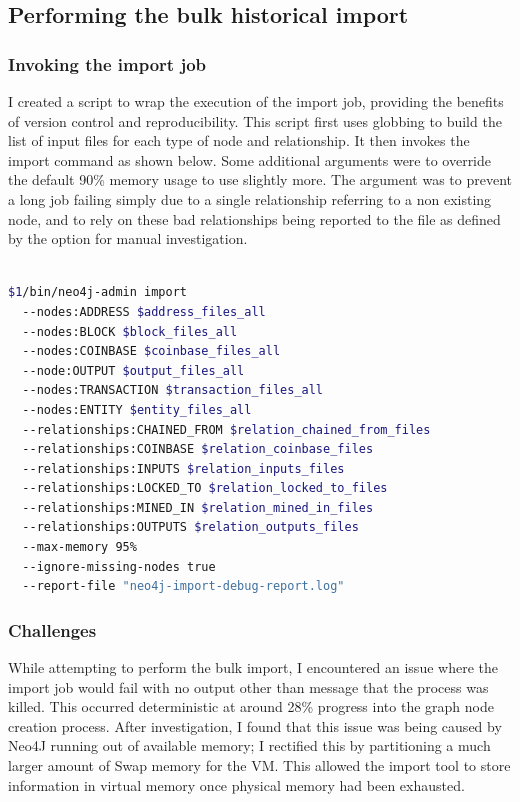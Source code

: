 \subsection{Performing the bulk historical import}

\subsubsection{Invoking the import job}
I created a script to wrap the execution of the import job, providing the benefits of version control and reproducibility. This script first uses globbing to build the list of input files for each type of node and relationship. It then invokes the import command as shown below. Some additional arguments were  to override the default 90\% memory usage to use slightly more. The argument  was to prevent a long job failing simply due to a single relationship referring to a non existing node, and to rely on these bad relationships being reported to the file as defined by the  option for manual investigation. 
\\\\
\begin{lstlisting}[language=Bash]
$1/bin/neo4j-admin import 
  --nodes:ADDRESS $address_files_all
  --nodes:BLOCK $block_files_all
  --nodes:COINBASE $coinbase_files_all
  --node:OUTPUT $output_files_all
  --nodes:TRANSACTION $transaction_files_all 
  --nodes:ENTITY $entity_files_all
  --relationships:CHAINED_FROM $relation_chained_from_files 
  --relationships:COINBASE $relation_coinbase_files 
  --relationships:INPUTS $relation_inputs_files 
  --relationships:LOCKED_TO $relation_locked_to_files 
  --relationships:MINED_IN $relation_mined_in_files 
  --relationships:OUTPUTS $relation_outputs_files 
  --max-memory 95% 
  --ignore-missing-nodes true 
  --report-file "neo4j-import-debug-report.log" 
\end{lstlisting}

\subsubsection{Challenges}
While attempting to perform the bulk import, I encountered an issue where the import job would fail with no output other than message that the process was killed. This occurred deterministic at around 28\% progress into the graph node creation process. After investigation, I found that this issue was being caused by Neo4J running out of available memory; I rectified this by partitioning a much larger amount of Swap memory for the VM. This allowed the import tool to store information in virtual memory once physical memory had been exhausted. 

